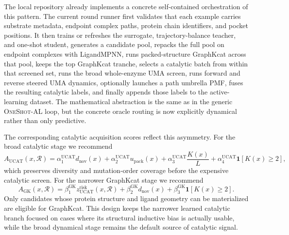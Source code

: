 \documentclass[11pt]{article}
\newcommand{\packunc}{\ensuremath{u_{\mathrm{pack}}}}
\newcommand{\methodIII}{\textsc{OneShot-AL}}
\begin{document}
	The local repository already implements a concrete self-contained orchestration of this pattern. The current round runner first validates that each example carries substrate metadata, endpoint complex paths, protein chain identifiers, and pocket positions. It then trains or refreshes the surrogate, trajectory-balance teacher, and one-shot student, generates a candidate pool, repacks the full pool on endpoint complexes with LigandMPNN, runs packed-structure GraphKcat across that pool, keeps the top GraphKcat tranche, selects a catalytic batch from within that screened set, runs the broad whole-enzyme UMA screen, runs forward and reverse steered UMA dynamics, optionally launches a path umbrella PMF, fuses the resulting catalytic labels, and finally appends those labels to the active-learning dataset. The mathematical abstraction is the same as in the generic \methodIII{} loop, but the concrete oracle routing is now explicitly dynamical rather than only predictive.
	
	The corresponding catalytic acquisition scores reflect this asymmetry. For the broad catalytic stage we recommend
	\begin{equation}
		A_{\mathrm{UCAT}}(x,\mathcal{R})=
		\alpha^{\mathrm{UCAT}}_1 d_{\mathrm{nov}}(x)+
		\alpha^{\mathrm{UCAT}}_2 \packunc(x)+
		\alpha^{\mathrm{UCAT}}_3 \frac{K(x)}{L}+
		\alpha^{\mathrm{UCAT}}_4 \mathbf{1}[K(x)\ge 2],
	\end{equation}
	which preserves diversity and mutation-order coverage before the expensive catalytic screen. For the narrower GraphKcat stage we recommend
	\begin{equation}
		A_{\mathrm{GK}}(x,\mathcal{R})=
		\beta^{\mathrm{GK}}_1 z_{\mathrm{UCAT}}^{\mathrm{risk}}(x,\mathcal{R})+
		\beta^{\mathrm{GK}}_2 d_{\mathrm{nov}}(x)+
		\beta^{\mathrm{GK}}_3 \mathbf{1}[K(x)\ge 2].
	\end{equation}
	Only candidates whose protein structure and ligand geometry can be materialized are eligible for GraphKcat. This design keeps the narrower learned catalytic branch focused on cases where its structural inductive bias is actually usable, while the broad dynamical stage remains the default source of catalytic signal.
	
\end{document}
